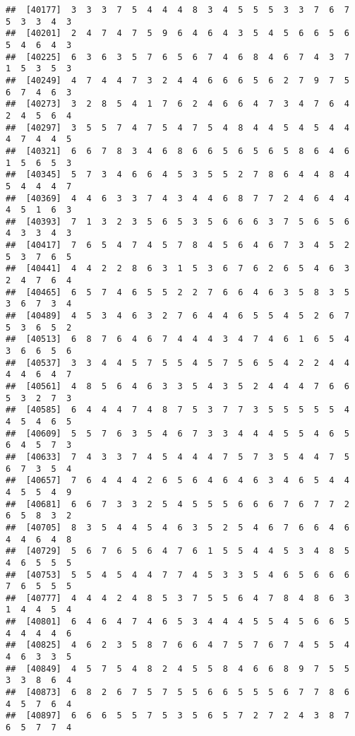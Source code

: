 \documentclass[
]{book}
\begin{document}
\begin{verbatim}
##  [40177]  3  3  3  7  5  4  4  4  8  3  4  5  5  5  3  3  7  6  7  5  3  3  4  3
##  [40201]  2  4  7  4  7  5  9  6  4  6  4  3  5  4  5  6  6  5  6  5  4  6  4  3
##  [40225]  6  3  6  3  5  7  6  5  6  7  4  6  8  4  6  7  4  3  7  1  5  3  5  3
##  [40249]  4  7  4  4  7  3  2  4  4  6  6  6  5  6  2  7  9  7  5  6  7  4  6  3
##  [40273]  3  2  8  5  4  1  7  6  2  4  6  6  4  7  3  4  7  6  4  2  4  5  6  4
##  [40297]  3  5  5  7  4  7  5  4  7  5  4  8  4  4  5  4  5  4  4  4  7  4  4  5
##  [40321]  6  6  7  8  3  4  6  8  6  6  5  6  5  6  5  8  6  4  6  1  5  6  5  3
##  [40345]  5  7  3  4  6  6  4  5  3  5  5  2  7  8  6  4  4  8  4  5  4  4  4  7
##  [40369]  4  4  6  3  3  7  4  3  4  4  6  8  7  7  2  4  6  4  4  4  5  1  6  3
##  [40393]  7  1  3  2  3  5  6  5  3  5  6  6  6  3  7  5  6  5  6  4  3  3  4  3
##  [40417]  7  6  5  4  7  4  5  7  8  4  5  6  4  6  7  3  4  5  2  5  3  7  6  5
##  [40441]  4  4  2  2  8  6  3  1  5  3  6  7  6  2  6  5  4  6  3  2  4  7  6  4
##  [40465]  6  5  7  4  6  5  5  2  2  7  6  6  4  6  3  5  8  3  5  3  6  7  3  4
##  [40489]  4  5  3  4  6  3  2  7  6  4  4  6  5  5  4  5  2  6  7  5  3  6  5  2
##  [40513]  6  8  7  6  4  6  7  4  4  4  3  4  7  4  6  1  6  5  4  3  6  6  5  6
##  [40537]  3  3  4  4  5  7  5  5  4  5  7  5  6  5  4  2  2  4  4  4  4  6  4  7
##  [40561]  4  8  5  6  4  6  3  3  5  4  3  5  2  4  4  4  7  6  6  5  3  2  7  3
##  [40585]  6  4  4  4  7  4  8  7  5  3  7  7  3  5  5  5  5  5  4  4  5  4  6  5
##  [40609]  5  5  7  6  3  5  4  6  7  3  3  4  4  4  5  5  4  6  5  6  4  5  7  3
##  [40633]  7  4  3  3  7  4  5  4  4  4  7  5  7  3  5  4  4  7  5  6  7  3  5  4
##  [40657]  7  6  4  4  4  2  6  5  6  4  6  4  6  3  4  6  5  4  4  4  5  5  4  9
##  [40681]  6  6  7  3  3  2  5  4  5  5  5  6  6  6  7  6  7  7  2  6  5  8  3  2
##  [40705]  8  3  5  4  4  5  4  6  3  5  2  5  4  6  7  6  6  4  6  4  4  6  4  8
##  [40729]  5  6  7  6  5  6  4  7  6  1  5  5  4  4  5  3  4  8  5  4  6  5  5  5
##  [40753]  5  5  4  5  4  4  7  7  4  5  3  3  5  4  6  5  6  6  6  7  6  5  5  5
##  [40777]  4  4  4  2  4  8  5  3  7  5  5  6  4  7  8  4  8  6  3  1  4  4  5  4
##  [40801]  6  4  6  4  7  4  6  5  3  4  4  4  5  5  4  5  6  6  5  4  4  4  4  6
##  [40825]  4  6  2  3  5  8  7  6  6  4  7  5  7  6  7  4  5  5  4  4  6  3  3  5
##  [40849]  4  5  7  5  4  8  2  4  5  5  8  4  6  6  8  9  7  5  5  3  3  8  6  4
##  [40873]  6  8  2  6  7  5  7  5  5  6  6  5  5  5  6  7  7  8  6  4  5  7  6  4
##  [40897]  6  6  6  5  5  7  5  3  5  6  5  7  2  7  2  4  3  8  7  6  5  7  7  4

\end{verbatim}
\end{document}
